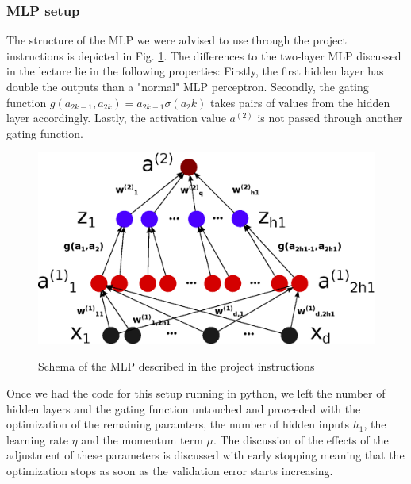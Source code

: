 \subsubsection{MLP setup}
The structure of the MLP we were advised to use through the project instructions is depicted in Fig. \ref{fig:mlp}. The differences to the two-layer MLP discussed in the lecture lie in the following properties: Firstly, the first hidden layer has double the outputs than a "normal" MLP perceptron. Secondly, the gating function $g(a_{2k-1}, a_{2k})=a_{2k-1}\sigma(a_2k)$ takes pairs of values from the hidden layer accordingly. Lastly, the activation value $a^{(2)}$ is not passed through another gating function.
\begin{figure}[!h]
	\centering
	\includegraphics[width=.6\textwidth]{mlp/mlp.eps}
	\label{fig:mlp}
	\caption{Schema of the MLP described in the project instructions}
\end{figure}
Once we had the code for this setup running in python, we left the number of hidden layers and the gating function untouched and proceeded with the optimization of the remaining paramters, the number of hidden inputs $h_1$, the learning rate $\eta$ and the momentum term $\mu$. The discussion of the effects of the adjustment of these parameters is discussed with early stopping meaning that the optimization stops as soon as the validation error starts increasing.
